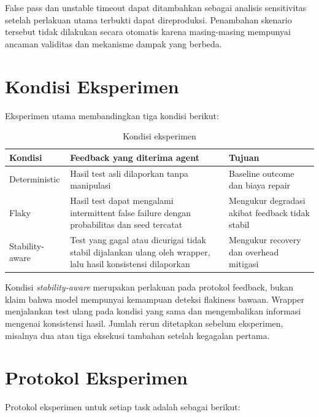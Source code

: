 False pass dan unstable timeout dapat ditambahkan sebagai analisis sensitivitas setelah perlakuan utama terbukti dapat direproduksi. Penambahan skenario tersebut tidak dilakukan secara otomatis karena masing-masing mempunyai ancaman validitas dan mekanisme dampak yang berbeda.

\section{Kondisi Eksperimen}

Eksperimen utama membandingkan tiga kondisi berikut:

\begin{table}[htbp]
\centering
\small
\renewcommand{\arraystretch}{1.25}
\caption{Kondisi eksperimen}
\label{tab:conditions}
\begin{tabularx}{\textwidth}{p{3.1cm}YY}
\toprule
\textbf{Kondisi} & \textbf{Feedback yang diterima agent} & \textbf{Tujuan} \\
\midrule
Deterministic & Hasil test asli dilaporkan tanpa manipulasi & Baseline outcome dan biaya repair \\
Flaky & Hasil test dapat mengalami intermittent false failure dengan probabilitas dan seed tercatat & Mengukur degradasi akibat feedback tidak stabil \\
Stability-aware & Test yang gagal atau dicurigai tidak stabil dijalankan ulang oleh wrapper, lalu hasil konsistensi dilaporkan & Mengukur recovery dan overhead mitigasi \\
\bottomrule
\end{tabularx}
\end{table}

Kondisi \textit{stability-aware} merupakan perlakuan pada protokol feedback, bukan klaim bahwa model mempunyai kemampuan deteksi flakiness bawaan. Wrapper menjalankan test ulang pada kondisi yang sama dan mengembalikan informasi mengenai konsistensi hasil. Jumlah rerun ditetapkan sebelum eksperimen, misalnya dua atau tiga eksekusi tambahan setelah kegagalan pertama.

\section{Protokol Eksperimen}

Protokol eksperimen untuk setiap task adalah sebagai berikut:

